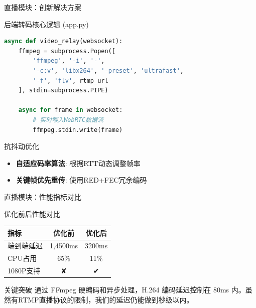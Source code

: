 \documentclass{beamer}
\begin{document}
\begin{frame}[fragile]{直播模块：创新解决方案}
    \begin{block}{后端转码核心逻辑 (app.py)}
        \begin{lstlisting}[language=Python]
async def video_relay(websocket):
    ffmpeg = subprocess.Popen([
        'ffmpeg', '-i', '-', 
        '-c:v', 'libx264', '-preset', 'ultrafast',
        '-f', 'flv', rtmp_url
    ], stdin=subprocess.PIPE)
  
    async for frame in websocket:
        # 实时喂入WebRTC数据流
        ffmpeg.stdin.write(frame)
\end{lstlisting}
    \end{block}

    \begin{block}{抗抖动优化}
        \begin{itemize}
            \item \textbf{自适应码率算法}: 根据RTT动态调整帧率
            \item \textbf{关键帧优先重传}: 使用RED+FEC冗余编码
        \end{itemize}
    \end{block}
\end{frame}

\begin{frame}{直播模块：性能指标对比}
    \begin{block}{优化前后性能对比}
        \centering
        \begin{tabular}{lcc}
            \toprule
            \textbf{指标} & \textbf{优化前} & \textbf{优化后}                 \\
            \midrule
            端到端延迟       & 1,4500ms     & \color{green!70!black}3200ms \\
            CPU占用       & 65\%         & \color{green!70!black}11\%   \\
            1080P支持     & ✘            & \color{green!70!black}✔      \\
            \bottomrule
        \end{tabular}
    \end{block}
    \begin{alertblock}{关键突破}
        通过 FFmpeg 硬编码和异步处理，H.264 编码延迟控制在 80ms 内。虽然有RTMP直播协议的限制，我们的延迟仍能做到秒级以内。
    \end{alertblock}
\end{frame}

\end{document}
